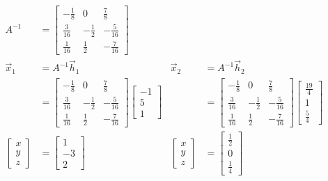 \begin{Answer}
\begin{align*}
A^{-1}&=
\begin{bmatrix}
-\frac{1}{8} & 0 & \frac{7}{8}\\
\frac{3}{16} & -\frac{1}{2} & -\frac{5}{16}\\
\frac{1}{16} & \frac{1}{2} & -\frac{7}{16}
\end{bmatrix} & & \\
\vec{x}_1 &= A^{-1}\vec{h}_1 & \vec{x}_2 &= A^{-1}\vec{h}_2 \\
&=
\begin{bmatrix}
-\frac{1}{8} & 0 & \frac{7}{8}\\
\frac{3}{16} & -\frac{1}{2} & -\frac{5}{16}\\
\frac{1}{16} & \frac{1}{2} & -\frac{7}{16}    
\end{bmatrix}
\begin{bmatrix}
-1 \\
5 \\
1
\end{bmatrix}
&
&=
\begin{bmatrix}
-\frac{1}{8} & 0 & \frac{7}{8}\\
\frac{3}{16} & -\frac{1}{2} & -\frac{5}{16}\\
\frac{1}{16} & \frac{1}{2} & -\frac{7}{16}    
\end{bmatrix}
\begin{bmatrix}
\frac{19}{4} \\
1 \\
\frac{5}{4}
\end{bmatrix} \\
\begin{bmatrix}
x\\
y\\
z
\end{bmatrix}
&=
\begin{bmatrix}
1\\
-3\\
2    
\end{bmatrix}
&
\begin{bmatrix}
x\\
y\\
z
\end{bmatrix}
&=
\begin{bmatrix}
\frac{1}{2}\\
0\\
\frac{1}{4}    
\end{bmatrix}
\end{align*}
\end{Answer}


